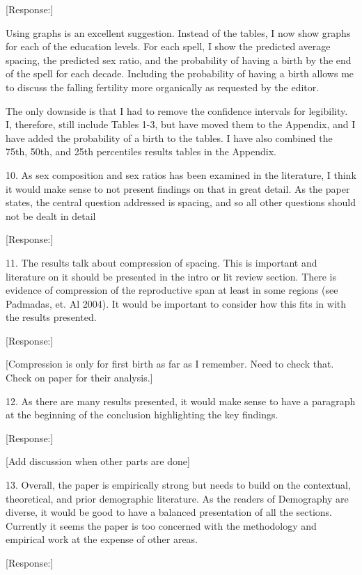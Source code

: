 \documentclass[letterpaper,12pt]{article}
\begin{document}
[Response:]

Using graphs is an excellent suggestion.
Instead of the tables, I now show graphs for each of the education levels.
For each spell, I show the predicted average spacing, the predicted sex ratio, and the 
probability of having a birth by the end of the spell for each decade.
Including the probability of having a birth allows me to discuss the falling fertility 
more organically as requested by the editor.

The only downside is that I had to remove the confidence intervals for legibility. 
I, therefore, still include Tables 1-3, but have moved them to the Appendix, and I have 
added the probability of a birth to the tables.
I have also combined the 75th, 50th, and 25th percentiles results tables in the Appendix.

10. As sex composition and sex ratios has been examined in the literature, I think
it would make sense to not present findings on that in great detail. As
the paper states, the central question addressed is spacing, and so all
other questions should not be dealt in detail

[Response:]

11. The results talk about compression of spacing. This is important and
literature on it should be presented in the intro or lit review section.
There is evidence of compression of the reproductive span at least in
some regions (see Padmadas, et. Al 2004). It would be important to
consider how this fits in with the results presented.

[Response:]

[Compression is only for first birth as far as I remember. Need to check that.
Check on paper for their analysis.]


12. As there are many results presented, it would make sense to have a
paragraph at the beginning of the conclusion highlighting the key
findings.

[Response:]

[Add discussion when other parts are done]

13. Overall, the paper is empirically strong but needs to build on the
contextual, theoretical, and prior demographic literature. As the
readers of Demography are diverse, it would be good to have a balanced
presentation of all the sections. Currently it seems the paper is too
concerned with the methodology and empirical work at the expense of
other areas.

[Response:]

\newpage
\end{document}
